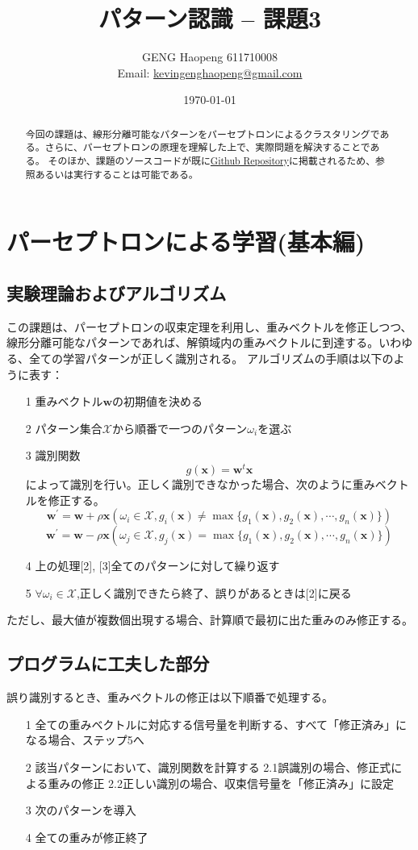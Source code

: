 \documentclass[ %
  uplatex,%
  papersize%
]{jsarticle}
\title{パターン認識 -- 課題3}
\author{\large GENG Haopeng 611710008 \\ \small Email:  \href{mailto:kevingenghaopeng@gmail.com}{kevingenghaopeng@gmail.com}}
\affil{\small Department of Intelligent Systems, Nagoya University}
\date{\today}
\begin{document}
\maketitle

\begin{abstract}
今回の課題は、線形分離可能なパターンをパーセプトロンによるクラスタリングである。さらに、パーセプトロンの原理を理解した上で、実際問題を解決することである。
そのほか、課題のソースコードが既に\href{https://github.com/Secondtonumb/pattern_recogn/tree/master/pattern03}{Github Repository}に掲載されるため、参照あるいは実行することは可能である。
\end{abstract}


\section{パーセプトロンによる学習(基本編)}
\subsection{実験理論およびアルゴリズム}
この課題は、パーセプトロンの収束定理を利用し、重みベクトルを修正しつつ、線形分離可能なパターンであれば、解領域内の重みベクトルに到達する。いわゆる、全ての学習パターンが正しく識別される。
アルゴリズム\cite{教科書}の手順は以下のように表す：
\begin{itemize}
\small
\item[1] 重みベクトル$\bm{w}$の初期値を決める
\item[2] パターン集合$\mathcal{X}$から順番で一つのパターン$\omega_{i}$を選ぶ
\item[3] 識別関数
	$$g(\bm{x})=\bm{w}^{t}\bm{x}$$
	によって識別を行い。正しく識別できなかった場合、次のように重みベクトルを修正する。
	$$\bm{w}^{'}= \bm{w} +\rho\bm{x}    (\omega_{i}\in\mathcal{X},g_{i}(\bm{x})\neq \max\{g_{1}(\bm{x}),g_{2}(\bm{x}),\cdots,g_{n}(\bm{x}) \})$$
	$$\bm{w}^{'}= \bm{w} -\rho\bm{x}     (\omega_{j}\in\mathcal{X},g_{j}(\bm{x})= \max\{g_{1}(\bm{x}),g_{2}(\bm{x}),\cdots,g_{n}(\bm{x}) \})$$
\item[4] 上の処理[2], [3]全てのパターンに対して繰り返す
\item[5]  $\forall \omega_{i}\in\mathcal{X}$,正しく識別できたら終了、誤りがあるときは[2]に戻る
\end{itemize}

ただし、最大値が複数個出現する場合、計算順で最初に出た重みのみ修正する。

\subsection{プログラムに工夫した部分}
誤り識別するとき、重みベクトルの修正は以下順番で処理する。
\begin{itemize}
\small
\item[1] 全ての重みベクトルに対応する信号量を判断する、すべて「修正済み」になる場合、ステップ5へ
\item[2] 該当パターンにおいて、識別関数を計算する
\subitem2.1誤識別の場合、修正式による重みの修正
\subitem2.2正しい識別の場合、収束信号量を「修正済み」に設定
\item[3] 次のパターンを導入
\item[4] 全ての重みが修正終了
\end{itemize}
\end{document}
